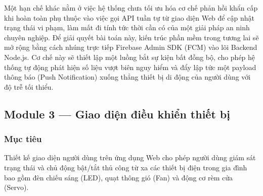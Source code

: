 Một hạn chế khác nằm ở việc hệ thống chưa tối ưu hóa cơ chế phản hồi khẩn cấp khi hoàn toàn phụ thuộc vào việc gọi API tuần tự từ giao diện Web để cập nhật trạng thái vi phạm, làm mất đi tính tức thời cần có của một giải pháp an ninh chuyên nghiệp. Để giải quyết bài toán này, kiến trúc phần mềm trong tương lai sẽ mở rộng bằng cách nhúng trực tiếp Firebase Admin SDK (FCM) vào lõi Backend Node.js. Cơ chế này sẽ thiết lập một luồng bắt sự kiện bất đồng bộ, cho phép hệ thống tự động phát hiện số liệu vượt biên nguy hiểm và đẩy lập tức một payload thông báo (Push Notification) xuống thẳng thiết bị di động của người dùng với độ trễ tối thiểu.

\subsection{Module 3 --- Giao diện điều khiển thiết bị}

\subsubsection{Mục tiêu}
Thiết kế giao diện người dùng trên ứng dụng Web cho phép người dùng giám sát trạng thái và chủ động bật/tắt thủ công từ xa các thiết bị điện trong gia đình bao gồm đèn chiếu sáng (LED), quạt thông gió (Fan) và động cơ rèm cửa (Servo).


